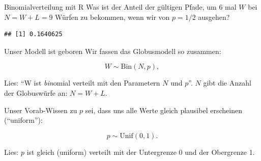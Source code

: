 \documentclass[
  ngerman,
  ignorenonframetext,
]{beamer}
\begin{document}
\begin{frame}[fragile]{Binomialverteilung mit R}
\protect\hypertarget{binomialverteilung-mit-r}{}
Was ist der Anteil der gültigen Pfade, um 6 mal \(W\) bei \(N=W+L=9\)
Würfen zu bekommen, wenn wir von \(p=1/2\) ausgehen?

\begin{verbatim}
## [1] 0.1640625
\end{verbatim}
\end{frame}

\begin{frame}{Unser Modell ist geboren}
\protect\hypertarget{unser-modell-ist-geboren}{}
Wir fassen das Globusmodell so zusammen:

\[W \sim \text{Bin}(N,p),\]

Lies: ``W ist \emph{bin}omial verteilt mit den Parametern \(N\) und
\(p\)''. \(N\) gibt die Anzahl der Globuswürfe an: \(N=W+L\).

Unser Vorab-Wissen zu \(p\) sei, dass uns alle Werte gleich plausibel
erscheinen (``uniform''):

\[p \sim \text{Unif}(0,1).\]

Lies: \(p\) ist gleich (uniform) verteilt mit der Untergrenze 0 und der
Obergrenze 1.
\end{frame}
\end{document}
